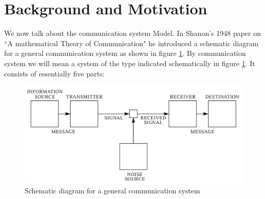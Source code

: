 \documentclass[12pt, oneside]{book}
\theoremstyle{definition}
\theoremstyle{definition}
\theoremstyle{remark}
\begin{document}
\section{Background and Motivation}
We now talk about the communication system Model. In Shanon's 1948 paper on ``A mathematical Theory of Communication" he introduced a schematic diagram for a general communication system as shown in figure \ref{fig:comm_model}. By communication system we will mean a system of the type indicated schematically in figure \ref{fig:comm_model}. It consists of essentially five parts:
\begin{figure}
    \centering
    \includegraphics[width=0.75\linewidth]{../images/comm_model.png}
    \caption{Schematic diagram for a general communication system}
    \label{fig:comm_model}
\end{figure}
\end{document}
